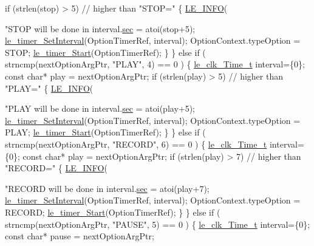 \begin{DoxyCodeInclude}
{{{{{{{{{            \textcolor{keywordflow}{if} (strlen(stop) > 5) \textcolor{comment}{// higher than "STOP="}
            \{
                \hyperlink{le__log_8h_a23e6d206faa64f612045d688cdde5808}{LE\_INFO}(\textcolor{stringliteral}{"STOP will be done in %
                interval.\hyperlink{structle__clk___time__t_ae28e527dbd551b3537edc1737611782f}{sec} = atoi(stop+5);
                \hyperlink{le__timer_8h_a0a103d5cef5e83fc9088859d527bbd43}{le\_timer\_SetInterval}(OptionTimerRef, interval);
                OptionContext.typeOption = STOP;
                \hyperlink{le__timer_8h_ada2ce7f8cb1e76ed959e323ae94bbfc0}{le\_timer\_Start}(OptionTimerRef);
            \}
        \}
        \textcolor{keywordflow}{else} \textcolor{keywordflow}{if} ( strncmp(nextOptionArgPtr, \textcolor{stringliteral}{"PLAY"}, 4) == 0 )
        \{
            \hyperlink{structle__clk___time__t}{le\_clk\_Time\_t} interval=\{0\};
            \textcolor{keyword}{const} \textcolor{keywordtype}{char}* play = nextOptionArgPtr;
            \textcolor{keywordflow}{if} (strlen(play) > 5) \textcolor{comment}{// higher than "PLAY="}
            \{
                \hyperlink{le__log_8h_a23e6d206faa64f612045d688cdde5808}{LE\_INFO}(\textcolor{stringliteral}{"PLAY will be done in %
                interval.\hyperlink{structle__clk___time__t_ae28e527dbd551b3537edc1737611782f}{sec} = atoi(play+5);
                \hyperlink{le__timer_8h_a0a103d5cef5e83fc9088859d527bbd43}{le\_timer\_SetInterval}(OptionTimerRef, interval);
                OptionContext.typeOption = PLAY;
                \hyperlink{le__timer_8h_ada2ce7f8cb1e76ed959e323ae94bbfc0}{le\_timer\_Start}(OptionTimerRef);
            \}
        \}
        \textcolor{keywordflow}{else} \textcolor{keywordflow}{if} ( strncmp(nextOptionArgPtr, \textcolor{stringliteral}{"RECORD"}, 6) == 0 )
        \{
            \hyperlink{structle__clk___time__t}{le\_clk\_Time\_t} interval=\{0\};
            \textcolor{keyword}{const} \textcolor{keywordtype}{char}* play = nextOptionArgPtr;
            \textcolor{keywordflow}{if} (strlen(play) > 7) \textcolor{comment}{// higher than "RECORD="}
            \{
                \hyperlink{le__log_8h_a23e6d206faa64f612045d688cdde5808}{LE\_INFO}(\textcolor{stringliteral}{"RECORD will be done in %
                interval.\hyperlink{structle__clk___time__t_ae28e527dbd551b3537edc1737611782f}{sec} = atoi(play+7);
                \hyperlink{le__timer_8h_a0a103d5cef5e83fc9088859d527bbd43}{le\_timer\_SetInterval}(OptionTimerRef, interval);
                OptionContext.typeOption = RECORD;
                \hyperlink{le__timer_8h_ada2ce7f8cb1e76ed959e323ae94bbfc0}{le\_timer\_Start}(OptionTimerRef);
            \}
        \}
        \textcolor{keywordflow}{else} \textcolor{keywordflow}{if} ( strncmp(nextOptionArgPtr, \textcolor{stringliteral}{"PAUSE"}, 5) == 0 )
        \{
            \hyperlink{structle__clk___time__t}{le\_clk\_Time\_t} interval=\{0\};
            \textcolor{keyword}{const} \textcolor{keywordtype}{char}* pause = nextOptionArgPtr;

}}}}}}}}}}}}
\end{DoxyCodeInclude}
